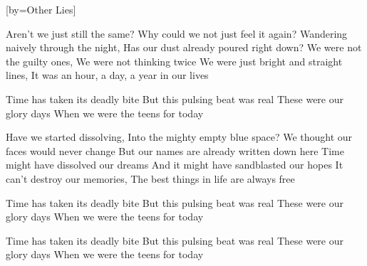 [by={Other Lies}]

  \chordsoff
  \beginverse
  Aren’t we just still the same?
  Why could we not just feel it again? 
  Wandering naively through the night,
  Has our dust already poured right down?
  We were not the guilty ones,
  We were not thinking twice 
  We were just bright and straight lines,
  It was an hour, a day, a year in our lives
  \endverse

  \beginchorus
  Time has taken its deadly bite
  But this pulsing beat was real
  These were our glory days
  When we were the teens for today
  \endchorus

  \beginverse
  Have we started dissolving,
  Into the mighty empty blue space?
  We thought our faces would never change
  But our names are already written down here 
  Time might have dissolved our dreams
  And it might have sandblasted our hopes 
  It can’t destroy our memories,
  The best things in life are always free
  \endverse

  \beginchorus
  Time has taken its deadly bite
  But this pulsing beat was real 
  These were our glory days
  When we were the teens for today
  \endchorus
  

  \beginchorus
  Time has taken its deadly bite
  But this pulsing beat was real 
  These were our glory days
  When we were the teens for today
  \endchorus
\endsong
